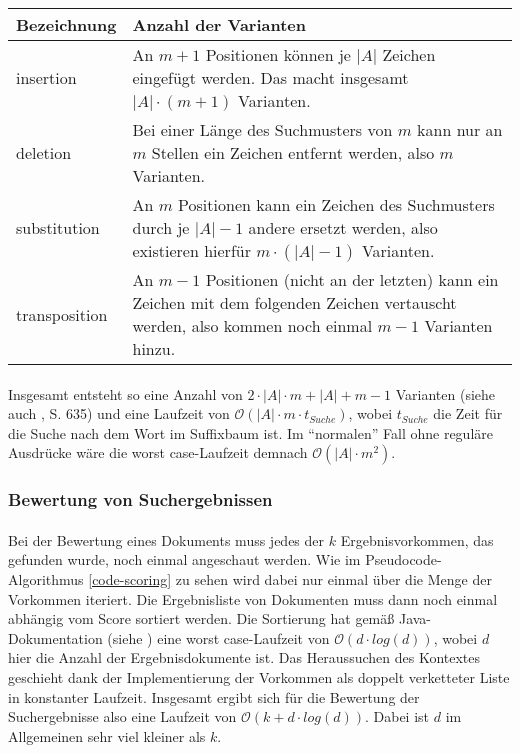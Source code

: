 \begin{tabularx}{\textwidth}{lX}
\hline
\textbf{Bezeichnung} & \textbf{Anzahl der Varianten} \\ [0.1cm]
\hline
insertion & An $m+1$ Positionen können je $|A|$ Zeichen eingefügt werden. Das macht insgesamt $|A| \cdot (m+1)$ Varianten.\\ [0.1cm]
\hline
deletion & Bei einer Länge des Suchmusters von $m$ kann nur an $m$ Stellen ein Zeichen entfernt werden, also $m$ Varianten. \\ [0.1cm]
\hline
substitution & An $m$ Positionen kann ein Zeichen des Suchmusters durch je $|A|-1$ andere ersetzt werden, also existieren hierfür $m \cdot (|A|-1)$ Varianten. \\ [0.1cm]
\hline
transposition & An $m-1$ Positionen (nicht an der letzten) kann ein Zeichen mit dem folgenden Zeichen vertauscht werden, also kommen noch einmal $m-1$ Varianten hinzu. \\ [0.1cm]
\hline
\end{tabularx}

\paragraph{} Insgesamt entsteht so eine Anzahl von $2 \cdot |A| \cdot m + |A| + m -1$ Varianten (siehe auch \cite{peterson}, S. 635) und eine Laufzeit von $\mathcal{O}(|A| \cdot m \cdot t_{Suche})$, wobei $t_{Suche}$ die Zeit für die Suche nach dem Wort im Suffixbaum ist. Im "`normalen"' Fall ohne reguläre Ausdrücke wäre die worst case-Laufzeit demnach $\mathcal{O}(|A| \cdot m^2 )$.

\subsubsection{Bewertung von Suchergebnissen}

\paragraph{} Bei der Bewertung eines Dokuments muss jedes der $k$ Ergebnisvorkommen, das gefunden wurde, noch einmal angeschaut werden. Wie im Pseudocode-Algorithmus \ref{code-scoring} zu sehen wird dabei nur einmal über die Menge der Vorkommen iteriert. Die Ergebnisliste von Dokumenten muss dann noch einmal abhängig vom Score sortiert werden. Die Sortierung hat gemäß Java\texttrademark-Dokumentation (siehe \cite{javaCollectionSort}) eine worst case-Laufzeit von $\mathcal{O}(d \cdot log(d))$, wobei $d$ hier die Anzahl der Ergebnisdokumente ist. Das Heraussuchen des Kontextes geschieht dank der Implementierung der Vorkommen als doppelt verketteter Liste in konstanter Laufzeit. Insgesamt ergibt sich für die Bewertung der Suchergebnisse also eine Laufzeit von $\mathcal{O}(k + d \cdot log(d))$. Dabei ist $d$ im Allgemeinen sehr viel kleiner als $k$.

